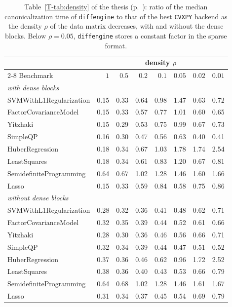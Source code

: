 \documentclass[letterpaper,12pt]{article}
\newcommand{\tpage}[1]{p.~\pageref{T-#1}}
\begin{document}
\begin{table}[htbp]
\centering
\caption{Table~\ref{T-tab:density} of the thesis (\tpage{tab:density}): ratio of the median canonicalization time of
\texttt{diffengine} to that of the best \texttt{CVXPY} backend as the density $\rho$ of the data
matrix decreases, with and without the dense blocks. Below $\rho = 0.05$, \texttt{diffengine}
stores a constant factor in the sparse format.}
\label{tab:new-density}
{\footnotesize
\begin{tabular}{l rrrrrrr}
\toprule
& \multicolumn{7}{c}{density $\rho$} \\
\cmidrule(lr){2-8}
Benchmark & $1$ & $0.5$ & $0.2$ & $0.1$ & $0.05$ & $0.02$ & $0.01$ \\
\midrule
\multicolumn{8}{l}{\emph{with dense blocks}} \\
SVMWithL1Regularization     &  0.15 &  0.33 &  0.64 &  0.98 &  1.47 &  0.63 &  0.72 \\
FactorCovarianceModel       &  0.15 &  0.33 &  0.57 &  0.77 &  1.01 &  0.60 &  0.65 \\
Yitzhaki                    &  0.15 &  0.29 &  0.53 &  0.75 &  0.99 &  0.67 &  0.73 \\
SimpleQP                    &  0.16 &  0.30 &  0.47 &  0.56 &  0.63 &  0.40 &  0.41 \\
HuberRegression             &  0.18 &  0.34 &  0.67 &  1.03 &  1.78 &  1.74 &  2.54 \\
LeastSquares                &  0.18 &  0.34 &  0.61 &  0.83 &  1.20 &  0.67 &  0.81 \\
SemidefiniteProgramming     &  0.64 &  0.67 &  1.02 &  1.28 &  1.46 &  1.60 &  1.66 \\
Lasso                       &  0.15 &  0.33 &  0.59 &  0.84 &  0.58 &  0.75 &  0.86 \\
\midrule
\multicolumn{8}{l}{\emph{without dense blocks}} \\
SVMWithL1Regularization     &  0.28 &  0.32 &  0.36 &  0.41 &  0.48 &  0.62 &  0.71 \\
FactorCovarianceModel       &  0.32 &  0.35 &  0.39 &  0.44 &  0.52 &  0.61 &  0.66 \\
Yitzhaki                    &  0.28 &  0.30 &  0.36 &  0.46 &  0.56 &  0.66 &  0.71 \\
SimpleQP                    &  0.32 &  0.34 &  0.39 &  0.44 &  0.47 &  0.51 &  0.52 \\
HuberRegression             &  0.37 &  0.36 &  0.46 &  0.62 &  0.96 &  1.72 &  2.52 \\
LeastSquares                &  0.38 &  0.36 &  0.40 &  0.43 &  0.53 &  0.66 &  0.79 \\
SemidefiniteProgramming     &  0.64 &  0.68 &  1.02 &  1.28 &  1.46 &  1.61 &  1.67 \\
Lasso                       &  0.31 &  0.34 &  0.37 &  0.45 &  0.54 &  0.69 &  0.79 \\
\bottomrule
\end{tabular}}
\end{table}
\end{document}
